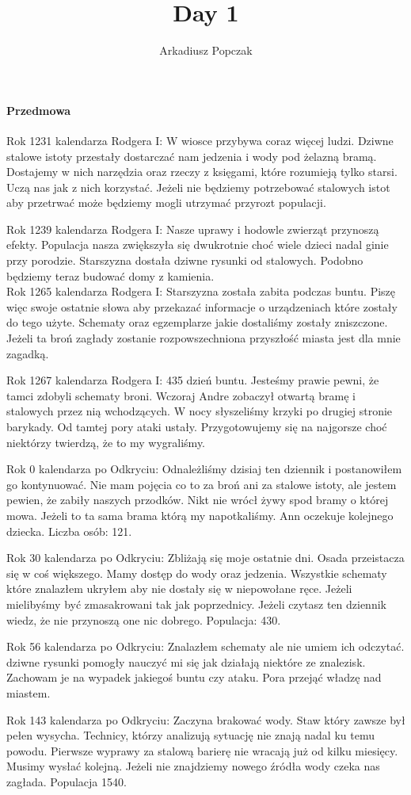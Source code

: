 \documentclass{article}
\title{\Huge{Day 1}}
\author{Arkadiusz Popczak}
\newcommand{\paragraphx}[1]{
        \paragraph{\Large{{#1}}}\mbox{}

    }
\begin{document}
    \maketitle

    \paragraphx{Przedmowa}
    Rok 1231 kalendarza Rodgera I: W wiosce przybywa coraz więcej ludzi. Dziwne stalowe istoty przestały dostarczać nam jedzenia i wody pod żelazną bramą. Dostajemy w nich narzędzia oraz rzeczy z księgami, które rozumieją tylko starsi. Uczą nas jak z nich korzystać. Jeżeli nie będziemy potrzebować stalowych istot aby przetrwać może będziemy mogli utrzymać przyrozt populacji.

    Rok 1239 kalendarza Rodgera I: Nasze uprawy i hodowle zwierząt przynoszą efekty. Populacja nasza zwiększyła się dwukrotnie choć wiele dzieci nadal ginie przy porodzie. Starszyzna dostała dziwne rysunki od stalowych. Podobno będziemy teraz budować domy z kamienia. \\
    Rok 1265 kalendarza Rodgera I: Starszyzna została zabita podczas buntu. Piszę więc swoje ostatnie słowa aby przekazać informacje o urządzeniach które zostały do tego użyte. Schematy oraz egzemplarze jakie dostaliśmy zostały zniszczone. Jeżeli ta broń zagłady zostanie rozpowszechniona przyszłość miasta jest dla mnie zagadką.

    Rok 1267 kalendarza Rodgera I: 435 dzień buntu. Jesteśmy prawie pewni, że tamci zdobyli schematy broni. Wczoraj Andre zobaczył otwartą bramę i stalowych przez nią wchodzących. W nocy słyszeliśmy krzyki po drugiej stronie barykady. Od tamtej pory ataki ustały. Przygotowujemy się na najgorsze choć niektórzy twierdzą, że to my wygraliśmy.

    Rok 0 kalendarza po Odkryciu: Odnależliśmy dzisiaj ten dziennik i postanowiłem go kontynuować. Nie mam pojęcia co to za broń ani za stalowe istoty, ale jestem pewien, że zabiły naszych przodków. Nikt nie wrócł żywy spod bramy o której mowa. Jeżeli to ta sama brama którą my napotkaliśmy. Ann oczekuje kolejnego dziecka. Liczba osób: 121.

    Rok 30 kalendarza po Odkryciu: Zbliżają się moje ostatnie dni. Osada przeistacza się w coś większego. Mamy dostęp do wody oraz jedzenia. Wszystkie schematy które znalazłem ukryłem aby nie dostały się w niepowołane ręce. Jeżeli mielibyśmy być zmasakrowani tak jak poprzednicy. Jeżeli czytasz ten dziennik wiedz, że nie przynoszą one nic dobrego. Populacja: 430.

    Rok 56 kalendarza po Odkryciu: Znalazłem schematy ale nie umiem ich odczytać. dziwne rysunki pomogły nauczyć mi się jak działają niektóre ze znalezisk. Zachowam je na wypadek jakiegoś buntu czy ataku. Pora przejąć władzę nad miastem.
    
    Rok 143 kalendarza po Odkryciu: Zaczyna brakować wody. Staw który zawsze był pełen wysycha. Technicy, którzy analizują sytuację nie znają nadal ku temu powodu. Pierwsze wyprawy za stalową barierę nie wracają już od kilku miesięcy. Musimy wysłać kolejną. Jeżeli nie znajdziemy nowego źródła wody czeka nas zagłada. Populacja 1540.

    
\end{document}

